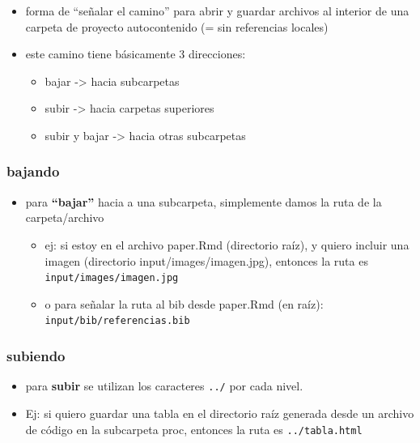 \documentclass[
  letterpaper,
  DIV=11,
  numbers=noendperiod]{scrartcl}
\begin{document}
\begin{itemize}
\item
  forma de ``señalar el camino'' para abrir y guardar archivos al
  interior de una carpeta de proyecto autocontenido (= sin referencias
  locales)
\item
  este camino tiene básicamente 3 direcciones:

  \begin{itemize}
  \item
    bajar -\textgreater{} hacia subcarpetas
  \item
    subir -\textgreater{} hacia carpetas superiores
  \item
    subir y bajar -\textgreater{} hacia otras subcarpetas
  \end{itemize}
\end{itemize}

\subsubsection{bajando}\label{bajando}

\begin{itemize}
\item
  para \textbf{``bajar''} hacia a una subcarpeta, simplemente damos la
  ruta de la carpeta/archivo

  \begin{itemize}
  \item
    ej: si estoy en el archivo paper.Rmd (directorio raíz), y quiero
    incluir una imagen (directorio input/images/imagen.jpg), entonces la
    ruta es \texttt{input/images/imagen.jpg}
  \item
    o para señalar la ruta al bib desde paper.Rmd (en raíz):
    \texttt{input/bib/referencias.bib}
  \end{itemize}
\end{itemize}

\subsubsection{subiendo}\label{subiendo}

\begin{itemize}
\item
  para \textbf{subir} se utilizan los caracteres \texttt{../} por cada
  nivel.
\item
  Ej: si quiero guardar una tabla en el directorio raíz generada desde
  un archivo de código en la subcarpeta proc, entonces la ruta es
  \texttt{../tabla.html}
\end{itemize}
\end{document}
